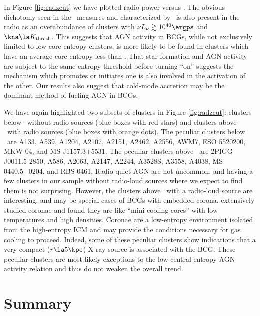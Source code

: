 \documentclass{emulateapj}
\begin{document}
In Figure \ref{fig:radzcut} we have plotted radio power versus \kna.
The obvious dichotomy seen in the \halpha\ measures and characterized
by \kthr\, is also present in the radio as an overabundance of
clusters with $\nu L_{\nu} \gtrsim 10^{40} \ergps$ and $\kna \la
\kthr$.  This suggests that AGN activity in BCGs, while not
exclusively limited to low core entropy clusters, is more likely to be
found in clusters which have an average core entropy less than
\kthr. That star formation and AGN activity are subject to the same
entropy threshold before turning ``on'' suggests the mechanism which
promotes or initiates one is also involved in the activation of the
other. Our results also suggest that cold-mode accretion
\citep{pizzolato05, hardcastle07} may be the dominant method of
fueling AGN in BCGs.

We have again highlighted two subsets of clusters in Figure
\ref{fig:radzcut}: clusters below \kthr\ without radio sources (blue
boxes with red stars) and clusters above \kthr\ with radio sources
(blue boxes with orange dots). The peculiar clusters below \kthr\ are
A133, A539, A1204, A2107, A2151, A2462, A2556, AWM7, ESO 5520200, MKW
04, and MS J1157.3+5531. The peculiar clusters above \kthr\ are 2PIGG
J0011.5-2850, A586, A2063, A2147, A2244, A3528S, A3558, A4038, MS 0440.5+0204,
and RBS 0461. Radio-quiet AGN are not uncommon, and having a few clusters in
our sample without radio-loud sources where we expect to find them is
not surprising. However, the clusters above \kthr\ with a radio-loud
source are interesting, and may be special cases of BCGs with embedded
corona. \cite{coronae} extensively studied coronae and found they are
like ``mini-cooling cores'' with low temperatures and high
densities. Coronae are a low-entropy environment isolated from the
high-entropy ICM and may provide the conditions necessary for gas
cooling to proceed. Indeed, some of these peculiar clusters show
indications that a very compact ($r \la 5\kpc$) X-ray source is
associated with the BCG. These peculiar clusters are most likely
exceptions to the low central entropy-AGN activity relation and thus
do not weaken the overall trend.

\section{Summary}
\label{sec:diss}
\end{document}
